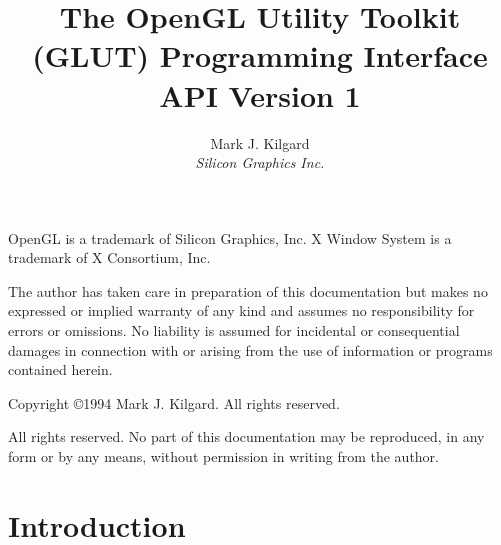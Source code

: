 



\pagestyle{headings}

\def\resetNote{\setcounter{NoteNum}{0}}
\def\takeNote{\addtocounter{NoteNum}{1}(\theNoteNum)}
\def\sameNote{(\theNoteNum)}

\title{ 
{\huge
The OpenGL Utility Toolkit (GLUT) Programming Interface} \\
\vspace{.4in}
API Version 1}
\author{Mark J. Kilgard \\
{\em Silicon Graphics Inc.}}

\maketitle

\setcounter{page}{0}

\renewcommand{\thepage}{\roman{page}}

OpenGL is a trademark of Silicon Graphics, Inc.  X Window System is
a trademark of X Consortium, Inc.

The author has taken care in preparation of this documentation but makes no
expressed or implied warranty of any kind and assumes no 
responsibility for errors or omissions.  No liability is assumed
for incidental or consequential damages in connection with or arising
from the use of information or programs contained herein.

\vspace{.5in}

\begin{center}
Copyright \copyright 1994 Mark J. Kilgard.  All rights reserved.
\end{center}

\vspace{.5in}

All rights reserved.  No part of this documentation may be reproduced,
in any form or by any means, without permission in writing from the author.

\newpage

\tableofcontents

\cleardoublepage

\setcounter{page}{1}

\renewcommand{\thepage}{\arabic{page}}

\section{Introduction}

